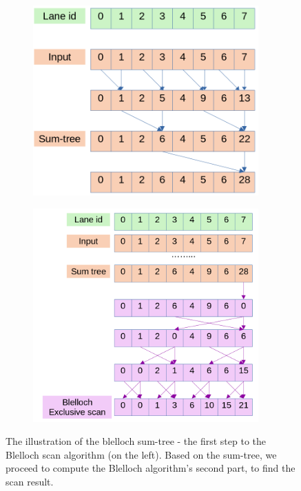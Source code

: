 \begin{figure}
  \centering
  \begin{subfigure}[t]{0.45\textwidth}
    \centering
    \includegraphics[width=0.95\textwidth]{pngs/blelloch_sum_tree.png.png}
  \end{subfigure}
  \begin{subfigure}[t]{0.45\textwidth}
    \centering
    \includegraphics[width=0.95\textwidth]{pngs/blelloch.png}
\end{subfigure}
  \caption{The illustration of the blelloch sum-tree - the first step to the Blelloch scan algorithm (on the left).
  Based on the sum-tree, we proceed to compute the Blelloch algorithm's second part, to find the scan result.}
\label{fig:blelloch_scan}
\end{figure}
